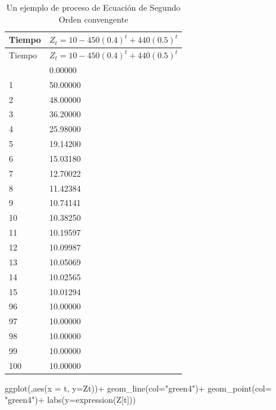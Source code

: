 \documentclass[
  a4paper,
]{article}
\newenvironment{Shaded}{}{}
\newcommand{\AttributeTok}[1]{\textcolor[rgb]{0.84,0.23,0.29}{#1}}
\newcommand{\FunctionTok}[1]{\textcolor[rgb]{0.44,0.26,0.76}{#1}}
\newcommand{\NormalTok}[1]{\textcolor[rgb]{0.14,0.16,0.18}{#1}}
\newcommand{\SpecialCharTok}[1]{\textcolor[rgb]{0.00,0.36,0.77}{#1}}
\newcommand{\StringTok}[1]{\textcolor[rgb]{0.01,0.18,0.38}{#1}}
\begin{document}
\hypertarget{tbl-table2}{}
\begin{longtable}[]{@{}ll@{}}
\caption{\label{tbl-table2}Un ejemplo de proceso de Ecuación de Segundo
Orden convengente}\tabularnewline
\toprule\noalign{}
Tiempo & \(Z_t =10-450(0.4)^t+440(0.5)^t\) \\
\midrule\noalign{}
\endfirsthead
\toprule\noalign{}
Tiempo & \(Z_t =10-450(0.4)^t+440(0.5)^t\) \\
\midrule\noalign{}
\endhead
\bottomrule\noalign{}
\endlastfoot
0 & 0.00000 \\
1 & 50.00000 \\
2 & 48.00000 \\
3 & 36.20000 \\
4 & 25.98000 \\
5 & 19.14200 \\
6 & 15.03180 \\
7 & 12.70022 \\
8 & 11.42384 \\
9 & 10.74141 \\
10 & 10.38250 \\
11 & 10.19597 \\
12 & 10.09987 \\
13 & 10.05069 \\
14 & 10.02565 \\
15 & 10.01294 \\
96 & 10.00000 \\
97 & 10.00000 \\
98 & 10.00000 \\
99 & 10.00000 \\
100 & 10.00000 \\
\end{longtable}

\begin{Shaded}
\begin{Highlighting}[]
\FunctionTok{ggplot}\NormalTok{(,}\FunctionTok{aes}\NormalTok{(}\AttributeTok{x =}\NormalTok{ t, }\AttributeTok{y=}\NormalTok{Zt))}\SpecialCharTok{+}
  \FunctionTok{geom\_line}\NormalTok{(}\AttributeTok{col=}\StringTok{"green4"}\NormalTok{)}\SpecialCharTok{+}
  \FunctionTok{geom\_point}\NormalTok{(}\AttributeTok{col=} \StringTok{"green4"}\NormalTok{)}\SpecialCharTok{+}
  \FunctionTok{labs}\NormalTok{(}\AttributeTok{y=}\FunctionTok{expression}\NormalTok{(Z[t]))}
\end{Highlighting}
\end{Shaded}
\end{document}
